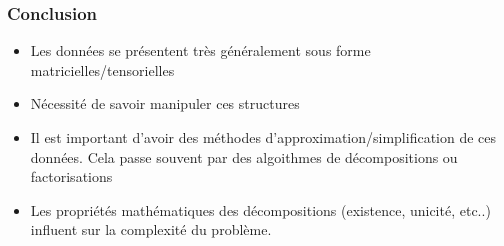 \documentclass[9pt]{beamer}
\begin{document}
\begin{frame}
\frametitle{Conclusion}

\begin{itemize}[label=\tiny$\blacksquare$]
	\item Les données se présentent très généralement sous forme matricielles/tensorielles
	\item Nécessité de savoir manipuler ces structures
	\item Il est important d'avoir des méthodes d'approximation/simplification de ces données. Cela passe souvent par des algoithmes de décompositions ou factorisations
	\item Les propriétés mathématiques des décompositions (existence, unicité, etc..) influent sur la complexité du problème.
\end{itemize}
\end{frame}
\end{document}

